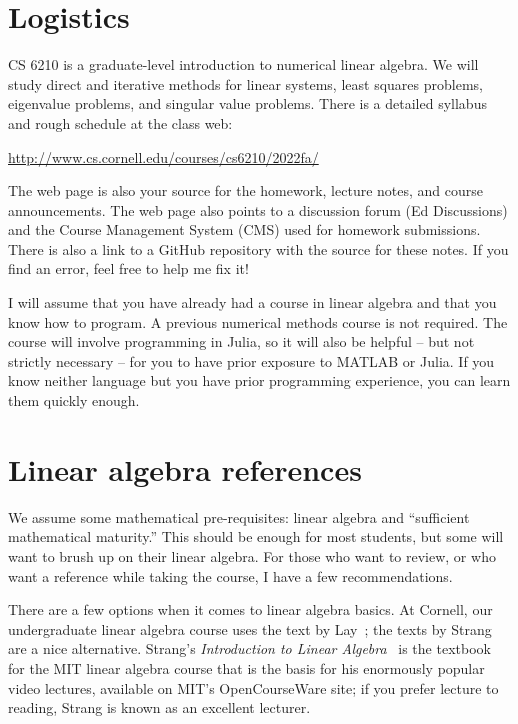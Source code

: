 \documentclass[12pt, leqno]{article} %
\begin{document}

\section{Logistics}

CS 6210 is a graduate-level introduction to numerical linear algebra. We
will study direct and iterative methods for linear systems, least
squares problems, eigenvalue problems, and singular value problems.
There is a detailed syllabus and rough schedule at the class web:
\begin{center}
  \url{http://www.cs.cornell.edu/courses/cs6210/2022fa/}
\end{center}
The web page is also your source for the homework, lecture notes,
and course announcements.  The web page also points to a discussion
forum (Ed Discussions) and the Course Management System (CMS) used for homework
submissions.  There is also a link to a GitHub repository with
the source for these notes.  If you find an error, feel free to
help me fix it!

I will assume that you have already had a course in linear algebra and
that you know how to program.  A previous numerical methods course is
not required.  The course will involve programming in Julia,
so it will also be helpful -- but not strictly necessary -- for you to
have prior exposure to MATLAB or Julia.  If you know neither
language but you have prior programming experience, you can learn them
quickly enough.

\section{Linear algebra references}

We assume some mathematical pre-requisites: linear algebra
and ``sufficient mathematical maturity.''  This should be enough for
most students, but some will want to brush up on their linear algebra.
For those who want to review, or who want a reference while taking
the course, I have a few recommendations.

There are a few options when it comes to linear algebra basics.  At
Cornell, our undergraduate linear algebra course uses the text
by Lay~\cite{Lay:2016:Linear}; the texts by Strang~\cite{Strang:2006:Linear,Strang:2009:Introduction} are a nice
alternative.  Strang's {\em Introduction to Linear Algebra}~\cite{Strang:2009:Introduction} is the textbook for the MIT
linear algebra course that is the basis for his enormously popular
video lectures, available on MIT's OpenCourseWare site; if you prefer
lecture to reading, Strang is known as an excellent lecturer.
\end{document}
